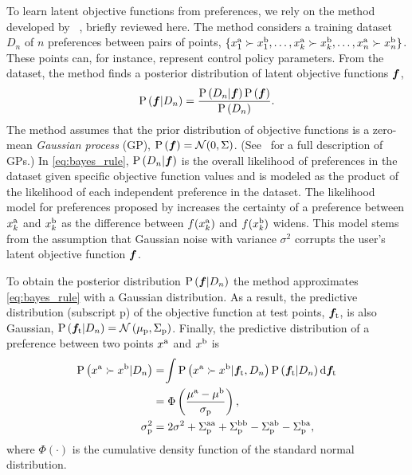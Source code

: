 To learn latent objective functions from preferences, we rely on the method
developed by \citeauthor{chu2005preference}~\citep{chu2005preference}, briefly
reviewed here.  The method considers a training dataset $D_n$ of $n$ preferences
between pairs of points, $\{x_1^{\mathrm{a}} \succ x_1^{\mathrm{b}}, \ldots, x_k^{\mathrm{a}}
\succ x_k^{\mathrm{b}}, \ldots, x_n^{\mathrm{a}} \succ x_n^{\mathrm{b}}\}$. These points can, for
instance, represent control policy parameters. From the dataset, the method
finds a posterior distribution of latent objective functions $\vecf{f}$,
\begin{align}
    \prob{\vecf{f}|D_n} = \frac{\prob{D_n|\vecf{f}}
        \prob{\vecf{f}}}{\prob{D_n}}.
    \label{eq:bayes_rule}
\end{align}
The method assumes that the prior distribution of objective functions is a
zero-mean \emph{Gaussian process} (GP), $\prob{\vecf{f}} = \mathcal{N}(0,
\Sigma)$.  (See~\citep{williams2006gaussian} for a full description of GPs.) In
\cref{eq:bayes_rule}, $\prob{D_n|\vecf{f}}$ is the overall likelihood of
preferences in the dataset given specific objective function values and is
modeled as the product of the likelihood of each independent preference in the
dataset. The likelihood model for preferences proposed by
\citeauthor{chu2005preference} increases the certainty of a preference between
$x_k^{\mathrm{a}}$ and $x_k^{\mathrm{b}}$ as the difference between $f(x_k^{\mathrm{a}})$ and
$f(x_k^{\mathrm{b}})$ widens. This model stems from the assumption that Gaussian
noise with variance $\sigma^2$ corrupts the user's latent objective function
$\vecf{f}$.

To obtain the posterior distribution $\prob{\vecf{f}|D_n}$ the method
approximates \cref{eq:bayes_rule} with a Gaussian distribution. As a result, the
predictive distribution (subscript p) of the objective function at test points,
$\vecf{f}[\tn{t}]$, is also Gaussian, $\prob{\vecf{f}[\tn{t}] | D_n} =
\mathcal{N} \left( \mu_\tn{p}, \Sigma_\tn{p} \right)$. Finally, the predictive
distribution of a preference between two points $x^{\mathrm{a}}$ and
$x^{\mathrm{b}}$ is 
\begin{align} 
    \prob{x^\tn{a} \succ x^\tn{b} |D_n} 
    &=\hspace{-2pt}\int \prob{x^\tn{a} \succ x^\tn{b}|\vecf{f}[\tn{t}],D_n}
    \prob{\vecf{f}[\tn{t}]| D_n} \tn{d} \vecf{f}[\tn{t}] 
        \label{eq:prob_of_pref}\\
    &= \Phi \left(\frac{\mu^\tn{a} - \mu^\tn{b}}{\sigma_\tn{p}} \right),
        \label{eq:p_pref} \\ 
    \sigma_\tn{p}^2 &= 2\sigma^2 + \Sigma_\tn{p}^\tn{aa} + \Sigma_\tn{p}^\tn{bb}
        - \Sigma_\tn{p}^\tn{ab} - \Sigma_\tn{p}^\tn{ba},
\end{align}
where $\Phi(\cdot)$ is the cumulative density function of the standard normal
distribution.

